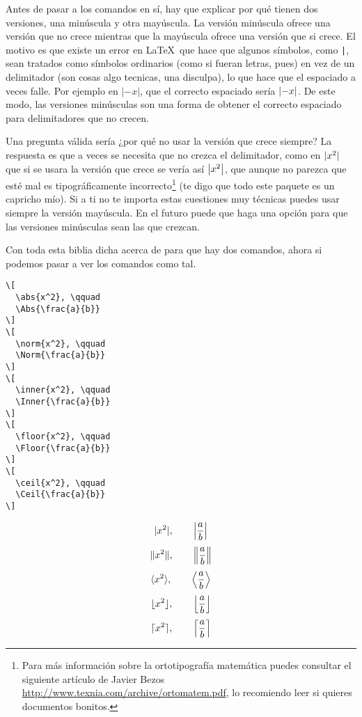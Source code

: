 \documentclass[11pt]{article}
\begin{document}
Antes de pasar a los comandos en sí, hay que explicar por qué tienen dos versiones, una minúscula y otra mayúscula. La versión minúscula ofrece una versión que no crece mientras que la mayúscula ofrece una versión que si crece. El motivo es que existe un error en \LaTeX\ que hace que algunos símbolos, como \texttt{|}, sean tratados como símbolos ordinarios (como si fueran letras, pues) en vez de un delimitador (son cosas algo tecnicas, una disculpa), lo que hace que el espaciado a veces falle. Por ejemplo en $|-x|$, que el correcto espaciado sería $\mathopen|-x\mathclose|$. De este modo, las versiones minúsculas son una forma de obtener el correcto espaciado para delimitadores que no crecen.

Una pregunta válida sería ¿por qué no usar la versión que crece siempre? La respuesta es que a veces se necesita que no crezca el delimitador, como en $\mathopen|x^2\mathclose|$ que si se usara la versión que crece se vería así $\Abs{x^2}$, que aunque no parezca que esté mal es tipográficamente incorrecto\footnote{Para más información sobre la ortotipografía matemática puedes consultar el siguiente artículo de Javier Bezos \url{http://www.texnia.com/archive/ortomatem.pdf}, lo recomiendo leer si quieres documentos bonitos.} (te digo que todo este paquete es un capricho mío). Si a ti no te importa estas cuestiones muy técnicas puedes usar siempre la versión mayúscula. En el futuro puede que haga una opción para que las versiones minúsculas sean las que crezcan.

Con toda esta biblia dicha acerca de para que hay dos comandos, ahora si podemos pasar a ver los comandos como tal.

\begin{center}
  \begin{minipage}{0.45\textwidth}
  \begin{verbatim}\[
  \abs{x^2}, \qquad
  \Abs{\frac{a}{b}}
\]
\[
  \norm{x^2}, \qquad
  \Norm{\frac{a}{b}}
\]
\[
  \inner{x^2}, \qquad
  \Inner{\frac{a}{b}}
\]
\[
  \floor{x^2}, \qquad
  \Floor{\frac{a}{b}}
\]
\[
  \ceil{x^2}, \qquad
  \Ceil{\frac{a}{b}}
\]\end{verbatim}
  \end{minipage}
  \begin{minipage}{0.45\textwidth}
  \[
    \abs{x^2}, \qquad
    \Abs{\frac{a}{b}}
  \]
  \[
    \norm{x^2}, \qquad
    \Norm{\frac{a}{b}}
  \]
  \[
    \inner{x^2}, \qquad
    \Inner{\frac{a}{b}}
  \]
  \[
    \floor{x^2}, \qquad
    \Floor{\frac{a}{b}}
  \]
  \[
    \ceil{x^2}, \qquad
    \Ceil{\frac{a}{b}}
  \]
  \end{minipage}
\end{center}
\end{document}

